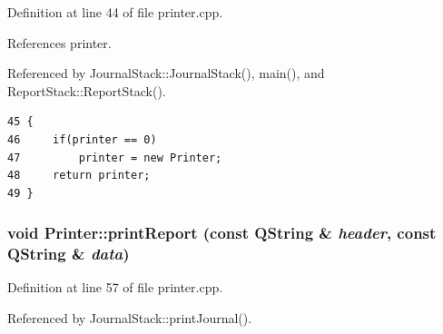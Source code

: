 Definition at line 44 of file printer.cpp.

References printer.

Referenced by Journal\-Stack::Journal\-Stack(), main(), and Report\-Stack::Report\-Stack().

\footnotesize\begin{verbatim}45 {
46     if(printer == 0)
47         printer = new Printer;
48     return printer;
49 }
\end{verbatim}\normalsize 


\hypertarget{classPrinter_a1}{
\subsubsection[printReport]{\setlength{\rightskip}{0pt plus 5cm}void Printer::print\-Report (const QString \& {\em header}, const QString \& {\em data})}}
\label{classPrinter_a1}


Definition at line 57 of file printer.cpp.

Referenced by Journal\-Stack::print\-Journal().

